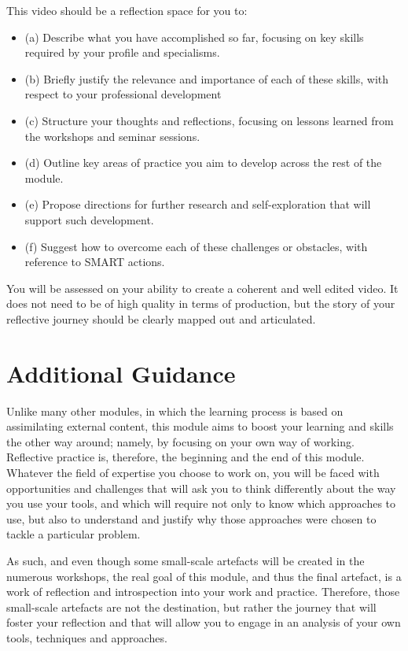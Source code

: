 \documentclass{../../fal_assignment_opendyslexic}
\begin{document}
This video should be a reflection space for you to:
\begin{itemize}
\item(a) Describe what you have accomplished so far, focusing on key skills required by your profile and specialisms.
\item (b) Briefly justify the relevance and importance of each of these skills, with respect to your professional development
\item(c) Structure your thoughts and reflections, focusing on lessons learned from the workshops and seminar sessions.
\item(d) Outline key areas of practice you aim to develop across the rest of the module.
\item(e) Propose directions for further research and self-exploration that will support such development.
\item (f) Suggest how to overcome each of these challenges or obstacles, with reference to SMART actions.
\end{itemize}
You will be assessed on your ability to create a coherent and well edited video. It does not need to be of high quality in terms of production, but the story of your reflective journey should be clearly mapped out and articulated.

\section*{Additional Guidance}

Unlike many other modules, in which the learning process is based on assimilating external content, this module aims to boost your learning and skills the other way around; namely, by focusing on your own way of working. Reflective practice is, therefore, the beginning and the end of this module. Whatever the field of expertise you choose to work on, you will be faced with opportunities and challenges that will ask you to think differently about the way you use your tools, and which will require not only to know which approaches to use, but also to understand and justify why those approaches were chosen to tackle a particular problem.

As such, and even though some small-scale artefacts will be created in the numerous workshops, the real goal of this module, and thus the final artefact, is a work of reflection and introspection into your work and practice. Therefore, those small-scale artefacts are not the destination, but rather the journey that will foster your reflection and that will allow you to engage in an analysis of your own tools, techniques and approaches.
\end{document}
